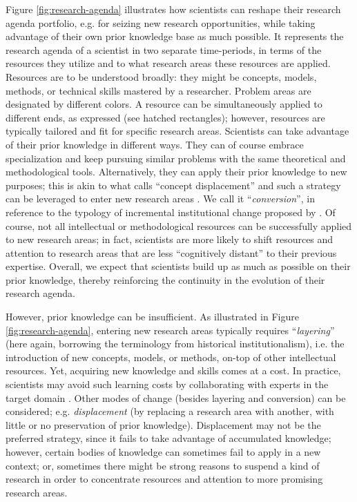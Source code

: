\documentclass{article}
\begin{document}
Figure \ref{fig:research-agenda} illustrates how scientists can reshape their research agenda portfolio, e.g. for seizing new research opportunities, while taking advantage of their own prior knowledge base as much possible. It represents the research agenda of a scientist in two separate time-periods, in terms of the resources they utilize and to what research areas these resources are applied. Resources are to be understood broadly: they might be concepts, models, methods, or technical skills mastered by a researcher. Problem areas are designated by different colors. A resource can be simultaneously applied to different ends, as expressed (see hatched rectangles); however, resources are typically tailored and fit for specific research areas. Scientists can take advantage of their prior knowledge in different ways. They can of course embrace specialization and keep pursuing similar problems with the same theoretical and methodological tools.  Alternatively, they can apply their prior knowledge to new purposes; this is akin to what \citet{schon1963displacement} calls ``concept displacement'' and such a strategy can be leveraged to enter new research areas \citep{Mulkay1974}. We call it ``\textit{conversion}'', in reference to the typology of incremental institutional change proposed by \citet{mahoney_thelen_2009}. Of course, not all intellectual or methodological resources can be successfully applied to new research areas; in fact, scientists are more likely to shift resources and attention to research areas that are less ``cognitively distant'' to their previous expertise. Overall, we expect that scientists build up as much as possible on their prior knowledge, thereby reinforcing the continuity in the evolution of their research agenda.

However, prior knowledge can be insufficient. As illustrated in Figure \ref{fig:research-agenda}, entering new research areas typically requires ``\textit{layering}'' (here again, borrowing the terminology from historical institutionalism), i.e. the introduction of new concepts, models, or methods, on-top of other intellectual resources. Yet, acquiring new knowledge and skills comes at a cost. In practice, scientists may avoid such learning costs by collaborating with experts in the target domain \citep{Tripodi2020}. Other modes of change (besides layering and conversion) can be considered; e.g. \textit{displacement} (by replacing a research area with another, with little or no preservation of prior knowledge). %
Displacement may not be the preferred strategy, since it fails to take advantage of accumulated knowledge; however, certain bodies of knowledge can sometimes fail to apply in a new context; or, sometimes there might be strong reasons to suspend a kind of research in order to concentrate resources and attention to more promising research areas. 
\end{document}

